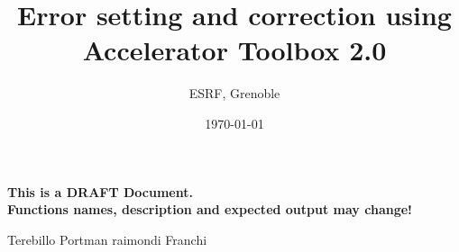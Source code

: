 \documentclass[10pt,a4paper]{article}
\title{Error setting and correction using \\ Accelerator Toolbox 2.0}
\date{\today}
\author{ESRF, Grenoble}
\begin{document}
\maketitle
{}
\tableofcontents
\newpage
{}

{\bf This is a DRAFT Document. \\
Functions names, description and expected output may change!}





\begin{thebibliography}{9}

  Terebillo
  Portman
  raimondi
  Franchi

\end{thebibliography}
\end{document}
